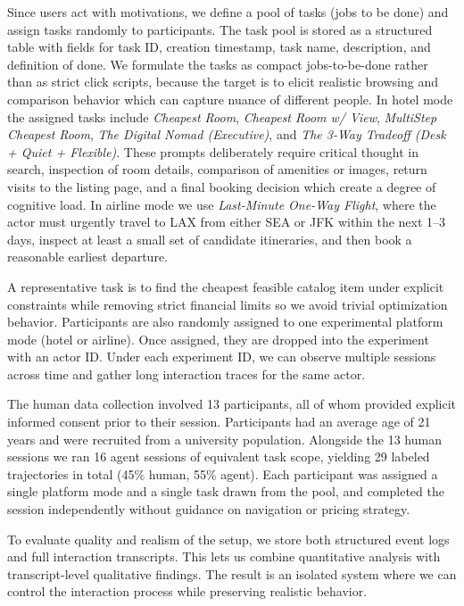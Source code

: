 Since users act with motivations, we define a pool of tasks (jobs to be done) and assign tasks randomly to participants. The task pool is stored as a structured table with fields for task ID, creation timestamp, task name, description, and definition of done. We formulate the tasks as compact jobs-to-be-done rather than as strict click scripts, because the target is to elicit realistic browsing and comparison behavior which can capture nuance of different people. In hotel mode the assigned tasks include \textit{Cheapest Room}, \textit{Cheapest Room w/ View}, \textit{MultiStep Cheapest Room}, \textit{The Digital Nomad (Executive)}, and \textit{The 3-Way Tradeoff (Desk + Quiet + Flexible)}. These prompts deliberately require critical thought in search, inspection of room details, comparison of amenities or images, return visits to the listing page, and a final booking decision which create a degree of cognitive load. In airline mode we use \textit{Last-Minute One-Way Flight}, where the actor must urgently travel to LAX from either SEA or JFK within the next 1--3 days, inspect at least a small set of candidate itineraries, and then book a reasonable earliest departure.

A representative task is to find the cheapest feasible catalog item under explicit constraints while removing strict financial limits so we avoid trivial optimization behavior. Participants are also randomly assigned to one experimental platform mode (hotel or airline). Once assigned, they are dropped into the experiment with an actor ID. Under each experiment ID, we can observe multiple sessions across time and gather long interaction traces for the same actor.

The human data collection involved 13 participants, all of whom provided explicit informed consent prior to their session. Participants had an average age of 21 years and were recruited from a university population. Alongside the 13 human sessions we ran 16 agent sessions of equivalent task scope, yielding 29 labeled trajectories in total (45\% human, 55\% agent). Each participant was assigned a single platform mode and a single task drawn from the pool, and completed the session independently without guidance on navigation or pricing strategy.

To evaluate quality and realism of the setup, we store both structured event logs and full interaction transcripts. This lets us combine quantitative analysis with transcript-level qualitative findings. The result is an isolated system where we can control the interaction process while preserving realistic behavior.

